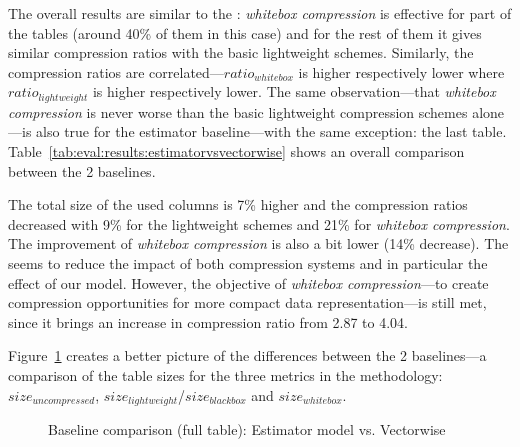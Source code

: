 The overall results are similar to the : \textit{whitebox compression} is effective for part of the tables (around 40\% of them in this case) and for the rest of them it gives similar compression ratios with the basic lightweight schemes. Similarly, the compression ratios are correlated---\(ratio_{whitebox}\) is higher respectively lower where \(ratio_{lightweight}\) is higher respectively lower. The same observation---that \textit{whitebox compression} is never worse than the basic lightweight compression schemes alone---is also true for the estimator baseline---with the same exception: the last table. Table~\ref{tab:eval:results:estimatorvsvectorwise} shows an overall comparison between the 2 baselines.



The total size of the used columns is 7\% higher and the compression ratios decreased with 9\% for the lightweight schemes and 21\% for \textit{whitebox compression}. The improvement of \textit{whitebox compression} is also a bit lower (14\% decrease). The  seems to reduce the impact of both compression systems and in particular the effect of our model. However, the objective of \textit{whitebox compression}---to create compression opportunities for more compact data representation---is still met, since it brings an increase in compression ratio from 2.87 to 4.04.

Figure~\ref{fig:eval:results:estimatorvsvw} creates a better picture of the differences between the 2 baselines---a comparison of the table sizes for the three metrics in the methodology: \(size_{uncompressed}\), \(size_{lightweight}\)/\(size_{blackbox}\) and \(size_{whitebox}\).

\begin{figure}[h]
  \centering
  \caption{Baseline comparison (full table): Estimator model vs. Vectorwise}
  \label{fig:eval:results:estimatorvsvw}
\end{figure}


